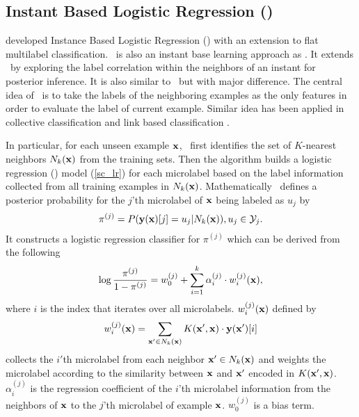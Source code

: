 {%
%
\subsection{Instant Based Logistic Regression (\iblr)}

\citet{Cheng09combining} developed Instance Based Logistic Regression (\iblr) with an extension to flat multilabel classification.
\iblr\ is also an instant base learning approach \citep{Aha91instance} as \mlknn.
It extends \mlknn\ by exploring the label correlation within the neighbors of an instant for posterior inference.
It is also similar to \cc\ but with major difference.
The central idea of \iblr\ is to take the labels of the neighboring examples as the only features in order to evaluate the label of current example.
Similar idea has been applied in collective classification \citep{Ghamrawi05collective} and link based classification \citep{Getoor05link, Getoor07introduction}.

In particular, for each unseen example $\mathbf {x}$, \iblr\ first identifies the set of $K$-nearest neighbors $N_k(\mathbf {x})$ from the training sets.
Then the algorithm builds a logistic regression (\lr) model (\ref{sc_lr}) for each microlabel based on the label information collected from all training examples in $N_k(\mathbf {x})$.
Mathematically \iblr\ defines a posterior probability for the $j$'th microlabel of $\mathbf {x}$ being labeled as $u_j$ by
\begin{align*}
	\pi^{(j)} = P( \mathbf {y}(\mathbf {x})[j]=u_j | N_k(\mathbf {x})), u_j\in\mathcal{Y}_j.
\end{align*}
It constructs a logistic regression classifier for $\pi^{(j)}$ which can be derived from the following 
\begin{align*}
	\log\frac{\pi^{(j)}}{1-\pi^{(j)}} = w_0^{(j)} + \sum_{i=1}^{k}\alpha_i^{(j)}\cdot w_{i}^{(j)}(\mathbf {x}),
\end{align*}
where $i$ is the index that iterates over all microlabels.
$w_i^{(j)}(\mathbf {x})$ defined by 
\begin{align*}
	w_i^{(j)}(\mathbf {x}) = \sum_{\mathbf {x}'\in N_k(\mathbf {x})}K(\mathbf {x}',\mathbf {x})\cdot \mathbf {y}(\mathbf {x}')[i]
\end{align*}
collects the $i'$th microlabel from each neighbor $\mathbf {x}'\in N_k(\mathbf {x})$ and weights the microlabel according to the similarity between $\mathbf {x}$ and $\mathbf {x}'$ encoded in $K(\mathbf {x}',\mathbf {x})$.
$\alpha_i^{(j)}$ is the regression coefficient of the $i$'th microlabel information from the neighbors of $\mathbf {x}$ to the $j$'th microlabel of example $\mathbf {x}$.
$w_0^{(j)}$ is a bias term.




}
